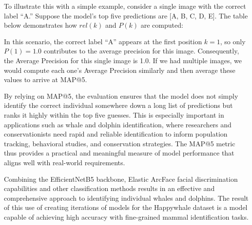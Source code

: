 \documentclass[twocolumn]{article}
\begin{document}
To illustrate this with a simple example, consider a single image with the correct label “A.” Suppose the model’s top five predictions are [A, B, C, D, E]. The table below demonstrates how \( rel(k) \) and \( P(k) \) are computed:

\begin{table}[ht!]
\centering
\renewcommand{\arraystretch}{1.5} %
\caption{Example computation of \( rel(k) \) and \( P(k) \) for an image with the correct label “A.” The first prediction is correct, so \( rel(k) \) is 1 for \( k = 1 \), and subsequent predictions contribute 0.}
\label{tab:map5_example}
\end{table}

In this scenario, the correct label “A” appears at the first position \( k=1 \), so only \( P(1) = 1.0 \) contributes to the average precision for this image. Consequently, the Average Precision for this single image is 1.0. If we had multiple images, we would compute each one’s Average Precision similarly and then average these values to arrive at MAP@5.

By relying on MAP@5, the evaluation ensures that the model does not simply identify the correct individual somewhere down a long list of predictions but ranks it highly within the top five guesses. This is especially important in applications such as whale and dolphin identification, where researchers and conservationists need rapid and reliable identification to inform population tracking, behavioral studies, and conservation strategies. The MAP@5 metric thus provides a practical and meaningful measure of model performance that aligns well with real-world requirements.

Combining the EfficientNetB5 backbone, Elastic ArcFace facial discrimination capabilities and other classification methods results in an effective and comprehensive approach to identifying individual whales and dolphins. The result of this use of creating iterations of models for the Happywhale dataset is a model capable of achieving high accuracy with fine-grained mammal identification tasks.
\end{document}
